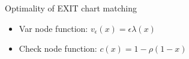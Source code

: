\begin{frame}{Optimality of EXIT chart matching}
\begin{itemize}
\item Var node function: $v_{\epsilon}(x) = \epsilon \lambda(x)$
\item Check node function: $c(x) = 1- \rho(1-x)$
\end{itemize}
\begin{center}
\scalebox{0.45}{}
\end{center}
\end{frame}
%
